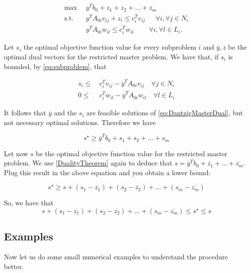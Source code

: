\documentclass[a4paper,12pt]{article}
\begin{document}
\begin{equation}
\begin{aligned}
\label{eq:DantzigMasterDual}
\max \enspace  & y^Tb_0 + z_1 + z_2 + \dots + z_m  \\
\text{s.t.} \enspace & y^TA_{0i}v_{ij} + z_i \leq c_i^Tv_{ij} \enspace \quad \forall i, \forall j \in N_i \\
& y^TA_{0i}w_{il} \leq c_i^Tw_{il} \quad \quad \: \forall i, \forall l \in L_i .
\end{aligned}
\end{equation}

Let  $s_i$ the optimal objective function value for every subproblem $i$ and $\overline{y}, \overline{z}$ be the optimal dual vectors for the restricted master problem. We have that, if $s_i$ is bounded, by \eqref{eq:subproblem}, that

\begin{align*}
s_i \leq\: & c_i^Tv_{ij} - \overline{y}^TA_{0i}v_{ij} \quad \forall j \in N_i \\
  0 \leq\: & c_i^Tw_{il} - \overline{y}^TA_{0i}w_{il} \quad \forall l \in L_i
\end{align*} 

It follows that $\overline{y}$ and the $s_i$ are feasible solutions of \eqref{eq:DantzigMasterDual}, but not necessary optimal solutions. Therefore we have

\[
s^\star \geq \overline{y}^Tb_0 + s_1 + s_2 + \dots + s_m
\]

Let now $s$ be the optimal objective function value for the restricted master problem. We use \eqref{DualityTheorem} again to deduce that $s = \overline{y}^Tb_0 + \overline{z_1} + \dots + \overline{z_m}$. Plug this result in the above equation and you obtain a lower bound:

\begin{equation}
s^\star \geq s + (s_1 - \overline{z_1}) + (s_2 - \overline{z_2}) + \dots + (s_m - \overline{z_m})
\end{equation}

So, we have that 
\[
s + (s_1 - \overline{z_1}) + (s_2 - \overline{z_2}) + \dots + (s_m - \overline{z_m}) \leq s^\star \leq s
\]


\subsection{Examples}

Now let us do some small numerical examples to understand the procedure better.
\end{document}
